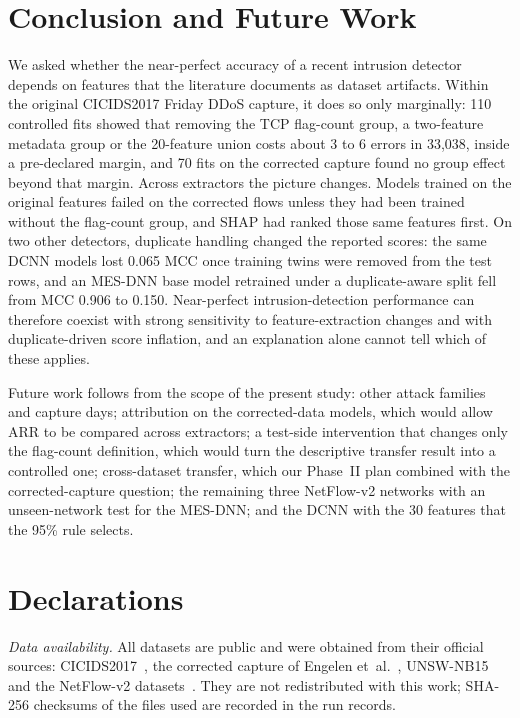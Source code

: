 \documentclass[journal]{IEEEtran}
\begin{document}
\section{Conclusion and Future Work}
\label{sec:conclusion}
We asked whether the near-perfect accuracy of a recent intrusion detector depends on features that
the literature documents as dataset artifacts. Within the original CICIDS2017 Friday DDoS capture,
it does so only marginally: 110 controlled fits showed that removing the TCP flag-count group, a
two-feature metadata group or the 20-feature union costs about 3 to 6 errors in 33,038, inside a
pre-declared margin, and 70 fits on the corrected capture found no group effect beyond that margin.
Across extractors the picture changes. Models trained on the original features failed on the
corrected flows unless they had been trained without the flag-count group, and SHAP had ranked those
same features first. On two other detectors, duplicate handling changed the reported scores: the
same DCNN models lost 0.065 MCC once training twins were removed from the test rows, and an MES-DNN
base model retrained under a duplicate-aware split fell from MCC 0.906 to 0.150. Near-perfect intrusion-detection performance
can therefore coexist with strong sensitivity to feature-extraction changes and with
duplicate-driven score inflation, and an explanation alone cannot tell which of these applies.

Future work follows from the scope of the present study: other attack families and capture days;
attribution on the corrected-data models, which would allow ARR to be compared across extractors; a
test-side intervention that changes only the flag-count definition, which would turn the descriptive
transfer result into a controlled one; cross-dataset transfer, which our Phase~II plan combined with
the corrected-capture question; the remaining three NetFlow-v2 networks with an unseen-network test
for the MES-DNN; and the DCNN with the 30 features that the 95\% rule selects.

\section*{Declarations}
\textit{Data availability.} All datasets are public and were obtained from their official sources:
CICIDS2017~\cite{sharafaldin2018}, the corrected capture of Engelen et~al.~\cite{engelen2021},
UNSW-NB15~\cite{moustafa2015} and the NetFlow-v2 datasets~\cite{sarhan2022}. They are not
redistributed with this work; SHA-256 checksums of the files used are recorded in the run records.
\end{document}
